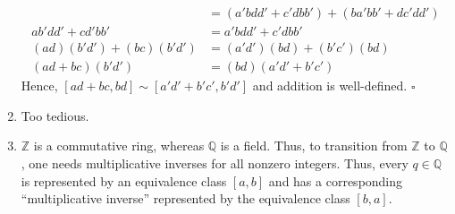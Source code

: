 \documentclass{article}
\newcommand{\Z}{\mathbb{Z}}
\newcommand{\Q}{\mathbb{Q}}
\begin{document}
\begin{enumerate}[label=\textbf{(\alph*)}]
{\begin{enumerate}[label=(\arabic*)]
{\begin{align*}
                                &= (a'bdd'+c'dbb')+(ba'bb'+dc'dd')\\
            ab'dd'+cd'bb'       &= a'bdd'+c'dbb'\\
            (ad)(b'd')+(bc)(b'd')
                                &= (a'd')(bd)+(b'c')(bd)\\
            (ad+bc)(b'd')       &= (bd)(a'd'+b'c')
          \end{align*}
          Hence, $[ad+bc,bd]\sim[a'd'+b'c',b'd']$ and addition is well-defined.
        }
        \hfill $\square$
      \end{enumerate}
    }
    \item{
      Too tedious.
    }
    \item{
      $\Z$ is a commutative ring, whereas $\Q$ is a field. Thus, to transition
      from $\Z$ to $\Q$, one needs multiplicative inverses for all nonzero
      integers. Thus, every $q\in\Q$ is represented by an equivalence class
      $[a,b]$ and has a corresponding ``multiplicative inverse'' represented by
      the equivalence class $[b,a]$.
    }
  \end{enumerate}
\end{document}
